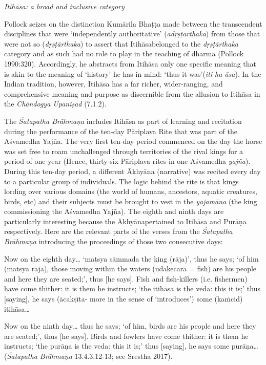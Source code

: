 \textit{Itihāsa: a broad and inclusive category}

Pollock seizes on the distinction Kumārila Bhaṭṭa made between the transcendent disciplines that were ‘independently authoritative’ (\textit{adṛṣṭārthaka}) from those that were not so (\textit{dṛṣṭārthaka}) to assert that Itihāsabelonged to the \textit{dṛṣṭārthaka} category and as such had no role to play in the teaching of dharma (Pollock 1990:320). Accordingly, he abstracts from Itihāsa only one specific meaning that is akin to the meaning of ‘history’ he has in mind: ‘thus it was’(\textit{iti ha āsa}). In the Indian tradition, however, Itihāsa has a far richer, wider-ranging, and comprehensive meaning and purpose as discernible from the allusion to Itihāsa in the \textit{Chāndogya Upaniṣad} (7.1.2). 

The \textit{Śatapatha Brāhmaṇa} includes Itihāsa as part of learning and recitation during the performance of the ten-day Pāriplava Rite that was part of the Aśvamedha Yajña. The very first ten-day period commenced on the day the horse was set free to roam unchallenged through territories of the rival kings for a period of one year (Hence, thirty-six Pāriplava rites in one Aśvamedha \textit{yajña}). During this ten-day period, a different Ākhyāna (narrative) was recited every day to a particular group of individuals. The logic behind the rite is that kings lording over various domains (the world of humans, ancestors, aquatic creatures, birds, etc) and their subjects must be brought to vest in the \textit{yajamāna} (the king commissioning the Aśvamedha Yajña). The eighth and ninth days are particularly interesting because the Ākhyānapertained to Itihāsa and Purāṇa respectively. Here are the relevant parts of the verses from the \textit{Śatapatha Brāhmaṇa} introducing the proceedings of those two consecutive days:

\begin{myquote}
Now on the eighth day… ‘matsya sāmmada the king (rāja)’, thus he says; ‘of him (matsya rāja), those moving within the waters (udakecarā = fish) are his people and here they are seated;’, thus [he says]. Fish and fish-killers (i.e. fishermen) have come thither: it is them he instructs; ‘the itihāsa is the veda: this it is;’ thus [saying], he says (ācakṣīta- more in the sense of ‘introduces’) some (kaṁcid) itihāsa…
\end{myquote}

\begin{myquote}
Now on the ninth day… thus he says; ‘of him, birds are his people and here they are seated;’, thus [he says]. Birds and fowlers have come thither: it is them he instructs; ‘the purāṇa is the veda: this it is;’ thus [saying], he says some purāṇa…(\textit{Śatapatha Brāhmaṇa} 13.4.3.12-13; see Srestha 2017).
\end{myquote}

